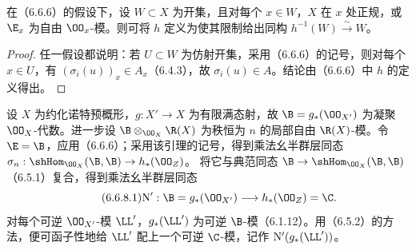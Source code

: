 在（6.6.6）的假设下，设 $W\subset X$ 为开集，且对每个 $x\in W$，$X$ 在 $x$ 处正规，或 $\E_x$ 为自由 $\OO_x$-模。则可将 $h$ 定义为使其限制给出同构 $h^{-1}(W)\xrightarrow{\sim}W$。
\begin{proof}
任一假设都说明：若 $U\subset W$ 为仿射开集，采用（6.6.6）的记号，则对每个 $x\in U$，有 $(\sigma_i(u))_x\in A_x$（6.4.3），故 $\sigma_i(u)\in A$。结论由（6.6.6）中 $h$ 的定义得出。
\end{proof}

设 $X$ 为约化诺特预概形，$g:X'\to X$ 为有限满态射，故 $\B=g_*(\OO_{X'})$ 为凝聚 $\OO_X$-代数。进一步设 $\B\otimes_{\OO_X}\R(X)$ 为秩恒为 $n$ 的局部自由 $\R(X)$-模。令 $\E=\B$，应用（6.6.6）；采用该引理的记号，得到乘法幺半群层同态
$\sigma_n:\shHom_{\OO_X}(\B,\B)\to h_*(\OO_Z)$。
将它与典范同态 $\B\to\shHom_{\OO_X}(\B,\B)$（6.5.1）复合，得到乘法幺半群层同态
\begin{equation}\tag{6.6.8.1}
\mathrm N':\B=g_*(\OO_{X'})\longrightarrow h_*(\OO_Z)=\C.
\end{equation}
对每个可逆 $\OO_{X'}$-模 $\LL'$，$g_*(\LL')$ 为可逆 $\B$-模（6.1.12）。用（6.5.2）的方法，便可函子性地给 $\LL'$ 配上一个可逆 $\C$-模，记作 $\mathrm N'(g_*(\LL'))$。

